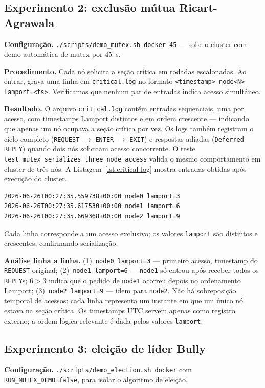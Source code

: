 \documentclass[10pt, a4paper, titlepage]{extarticle}
\begin{document}
\subsection{Experimento 2: exclusão mútua Ricart-Agrawala}
\textbf{Configuração.} \texttt{./scripts/demo\_mutex.sh docker 45} --- sobe o cluster com demo automática de mutex por 45~s.

\textbf{Procedimento.} Cada nó solicita a seção crítica em rodadas escalonadas. Ao entrar, grava uma linha em \texttt{critical.log} no formato \texttt{<timestamp> node<N> lamport=<ts>}. Verificamos que nenhum par de entradas indica acesso simultâneo.

\textbf{Resultado.} O arquivo \texttt{critical.log} contém entradas sequenciais, uma por acesso, com timestamps Lamport distintos e em ordem crescente --- indicando que apenas um nó ocupava a seção crítica por vez. Os logs também registram o ciclo completo (\texttt{REQUEST} $\rightarrow$ \texttt{ENTER} $\rightarrow$ \texttt{EXIT}) e respostas adiadas (\texttt{Deferred REPLY}) quando dois nós solicitam acesso concorrente. O teste \texttt{test\_mutex\_serializes\_three\_node\_access} valida o mesmo comportamento em cluster de três nós. A Listagem~\ref{lst:critical-log} mostra entradas obtidas após execução do cluster.

\begin{lstlisting}[caption={Trecho de \texttt{shared/critical.log} após demo de exclusão mútua.},label=lst:critical-log]
2026-06-26T00:27:35.559738+00:00 node0 lamport=3
2026-06-26T00:27:35.617530+00:00 node1 lamport=6
2026-06-26T00:27:35.669368+00:00 node2 lamport=9
\end{lstlisting}

Cada linha corresponde a um acesso exclusivo; os valores \texttt{lamport} são distintos e crescentes, confirmando serialização.

\textbf{Análise linha a linha.} (1)~\texttt{node0 lamport=3} --- primeiro acesso, timestamp do \texttt{REQUEST} original; (2)~\texttt{node1 lamport=6} --- \texttt{node1} só entrou após receber todos os \texttt{REPLY}s; $6 > 3$ indica que o pedido de \texttt{node1} ocorreu depois no ordenamento Lamport; (3)~\texttt{node2 lamport=9} --- idem para \texttt{node2}. Não há sobreposição temporal de acessos: cada linha representa um instante em que um único nó estava na seção crítica. Os timestamps UTC servem apenas como registro externo; a ordem lógica relevante é dada pelos valores \texttt{lamport}.

\subsection{Experimento 3: eleição de líder Bully}
\textbf{Configuração.}
\texttt{./scripts/demo\_election.sh docker} com
\texttt{RUN\_MUTEX\_DEMO=false}, para isolar o algoritmo de eleição.
\end{document}
